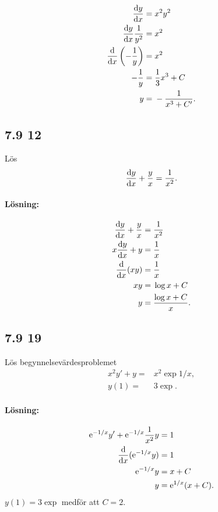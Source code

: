 \begin{align*}
	\derivative{y}{x} ={}& x^2 y^2\\
	\derivative{y}{x} \frac{1}{y^2} ={}& x^2\\
	\derivative{}{x} \left( -\frac{1}{y} \right) ={}& x^2\\
	-\frac{1}{y} ={}& \frac{1}{3} x^3 + C\\
	y ={}& -\frac{1}{x^3 + C'}.
\end{align*}
	

\subsection{7.9 12}%
\label{sub:7_9_12}

Lös
\begin{align*}
	\derivative{y}{x} + \frac{y}{x} = \frac{1}{x^2}.
\end{align*}

\paragraph{Lösning:}

\begin{align*}
	\derivative{y}{x} + \frac{y}{x} ={}& \frac{1}{x^2}\\
	x \derivative{y}{x} + y ={}& \frac{1}{x}\\
	\derivative{}{x}{(x y)} ={}& \frac{1}{x}\\
	x y ={}& \log{x} + C\\
	y ={}& \frac{\log{x} + C}{x}.
\end{align*}


\subsection{7.9 19}

Lös begynnelsevärdesproblemet
\begin{align*}
	x^2 y' + y ={}& x^2 \exp{1/x},\\
	y(1) ={}& 3 \exp{}.
\end{align*}

\paragraph{Lösning:}

\begin{align*}
	\exp{-1/x} y' + \exp{-1/x} \frac{1}{x^2} y ={}& 1\\
	\derivative{}{x}{(\exp{-1/x} y)} ={}& 1\\
	\exp{-1/x} y ={}& x + C\\
	y ={}& \exp{1/x} (x + C).
\end{align*}
$y(1) = 3 \exp{}$ medför att $C = 2$.


